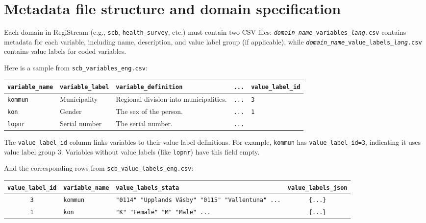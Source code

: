 \section{Metadata file structure and domain specification}

Each domain in RegiStream (e.g., \texttt{scb}, \texttt{health\_survey}, etc.) must contain two CSV files: \texttt{\textit{domain\_name}\_variables\_\textit{lang}.csv} contains metadata for each variable, including name, description, and value label group (if applicable), while \texttt{\textit{domain\_name}\_value\_labels\_\textit{lang}.csv} contains value labels for coded variables.

Here is a sample from \texttt{scb\_variables\_eng.csv}:

\vspace{0.5em}
\noindent
{\small
\begin{tabular}{@{}llp{5.5cm}cl@{}}
\hline
\texttt{variable\_name} & \texttt{variable\_label} & \texttt{variable\_definition} & \texttt{...} & \texttt{value\_label\_id} \\
\hline
\texttt{kommun} & Municipality & Regional division into municipalities. & \texttt{...} & \texttt{3} \\
\texttt{kon} & Gender & The sex of the person. & \texttt{...} & \texttt{1} \\
\texttt{lopnr} & Serial number & The serial number. & \texttt{...} & \\
\hline
\end{tabular}
}
\vspace{0.5em}

The \texttt{value\_label\_id} column links variables to their value label definitions. For example, \texttt{kommun} has \texttt{value\_label\_id=3}, indicating it uses value label group 3. Variables without value labels (like \texttt{lopnr}) have this field empty.

And the corresponding rows from \texttt{scb\_value\_labels\_eng.csv}:

\vspace{0.5em}
\noindent
{\small
\begin{tabular}{@{}clp{6cm}c@{}}
\hline
\texttt{value\_label\_id} & \texttt{variable\_name} & \texttt{value\_labels\_stata} & \texttt{value\_labels\_json} \\
\hline
\texttt{3} & \texttt{kommun} & \texttt{"0114" "Upplands V\"{a}sby" "0115" "Vallentuna" ...} & \texttt{\{...\}} \\
\texttt{1} & \texttt{kon} & \texttt{"K" "Female" "M" "Male" ...} & \texttt{\{...\}} \\
\hline
\end{tabular}
}
\vspace{0.5em}


